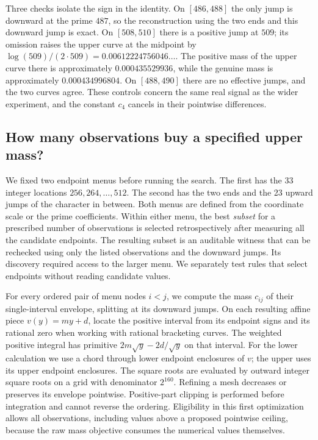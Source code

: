 \documentclass[12pt,letterpaper]{article}
\begin{document}
Three checks isolate the sign in the identity. On \([486,488]\) the only jump is downward at the prime \(487\), so the reconstruction using the two ends and this downward jump is exact. On \([508,510]\) there is a positive jump at \(509\); its omission raises the upper curve at the midpoint by \(\log(509)/(2\cdot509)=0.00612224756046\ldots\). The positive mass of the upper curve there is approximately \(0.000435529936\), while the genuine mass is approximately \(0.000434996804\). On \([488,490]\) there are no effective jumps, and the two curves agree. These controls concern the same real signal as the wider experiment, and the constant \(c_4\) cancels in their pointwise differences.

\subsection{How many observations buy a specified upper mass?}
We fixed two endpoint menus before running the search. The first has the 33 integer locations \(256,264,\ldots,512\). The second has the two ends and the 23 upward jumps of the character in between. Both menus are defined from the coordinate scale or the prime coefficients. Within either menu, the best \emph{subset} for a prescribed number of observations is selected retrospectively after measuring all the candidate endpoints. The resulting subset is an auditable witness that can be rechecked using only the listed observations and the downward jumps. Its discovery required access to the larger menu. We separately test rules that select endpoints without reading candidate values.

For every ordered pair of menu nodes \(i<j\), we compute the mass \(c_{ij}\) of their single-interval envelope, splitting at its downward jumps. On each resulting affine piece \(v(y)=my+d\), locate the positive interval from its endpoint signs and its rational zero when working with rational bracketing curves. The weighted positive integral has primitive \(2m\sqrt y-2d/\sqrt y\) on that interval. For the lower calculation we use a chord through lower endpoint enclosures of \(v\); the upper uses its upper endpoint enclosures. The square roots are evaluated by outward integer square roots on a grid with denominator \(2^{160}\). Refining a mesh decreases or preserves its envelope pointwise. Positive-part clipping is performed before integration and cannot reverse the ordering. Eligibility in this first optimization allows all observations, including values above a proposed pointwise ceiling, because the raw mass objective consumes the numerical values themselves.
\end{document}
